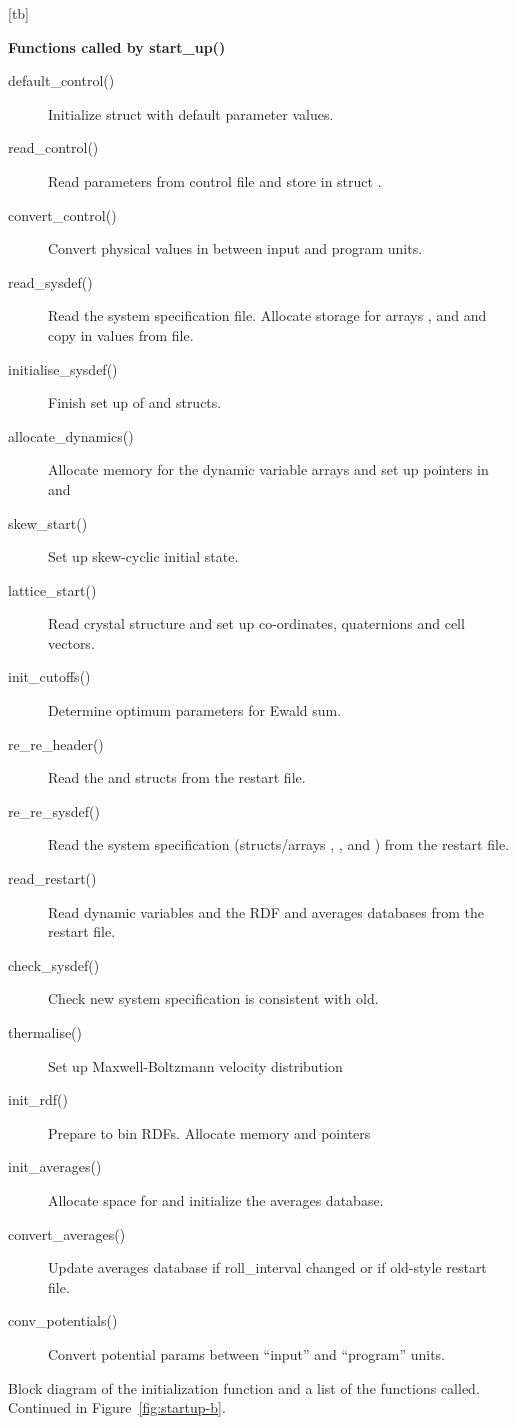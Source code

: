 \documentclass[a4paper,twoside]{report}
\makeatletter
\newenvironment{Litdescription}{\begingroup%
     \renewcommand{\descriptionlabel}[1]{\Lit{##1}}\begin{description}}%
     {\end{description}\endgroup}
\newcounter{subfig}
\newenvironment{superfig}{%
\setcounter{subfig}{0}
\addtocounter{figure}{1}
}{\setcounter{subfig}{0}}
\newenvironment{partfigure}[1][tbp]{%
\addtocounter{subfig}{1}\addtocounter{figure}{-1}%
\@float{figure}[#1]%
\renewcommand{\thefigure}{\thechapter.\arabic{figure}(\alph{subfig})}%
}{\end@float}
\makeatother
\begin{document}
\begin{superfig}
\begin{partfigure}[tb]
\noindent

\begin{minipage}[b]{2.55in}
\raggedright
\textbf{Functions called by start\_up()}\\
\footnotesize
\setlength{\leftmargini}{1em}
\begin{Litdescription}
\item[default\_control()] Initialize struct  with
  default parameter values.
\item[read\_control()] Read parameters from control file and store in struct
  .
\item[convert\_control()] Convert physical values in 
  between input and program units.
\item[read\_sysdef()] Read the system specification file. Allocate
  storage for arrays ,  and
   and copy in values from file.
\item[initialise\_sysdef()] Finish set up of  and
   structs.
\item[allocate\_dynamics()] Allocate memory for the dynamic variable
  arrays and set up pointers in  and 
\item[skew\_start()] Set up skew-cyclic initial state.
\item[lattice\_start()] Read crystal structure and set up
  co-ordinates, quaternions and cell vectors.
\item[init\_cutoffs()] Determine optimum parameters for Ewald sum.
\item[re\_re\_header()] Read the  and 
  structs from the restart file.                                        
\item[re\_re\_sysdef()] Read the system specification (structs/arrays
  , ,  and
  ) from the restart file.
\item[read\_restart()] Read dynamic variables and the RDF and averages
  databases from the restart file.
\item[check\_sysdef()] Check new system specification is consistent
  with old.
\item[thermalise()] Set up Maxwell-Boltzmann velocity distribution
\item[init\_rdf()] Prepare to bin RDFs.  Allocate memory and pointers
\item[init\_averages()] Allocate space for and initialize the averages
  database.
\item[convert\_averages()] Update averages database if roll\_interval
  changed or if old-style restart file.
\item[conv\_potentials()] Convert potential params between ``input''
  and ``program'' units.
\end{Litdescription}
\end{minipage}
\caption[Block diagram of initialization function
]{Block diagram of the initialization function
   and a list of the functions called.  Continued
  in Figure~\ref{fig:startup-b}.}
\label{fig:startup-a}


\end{partfigure}
\end{superfig}
\end{document}
